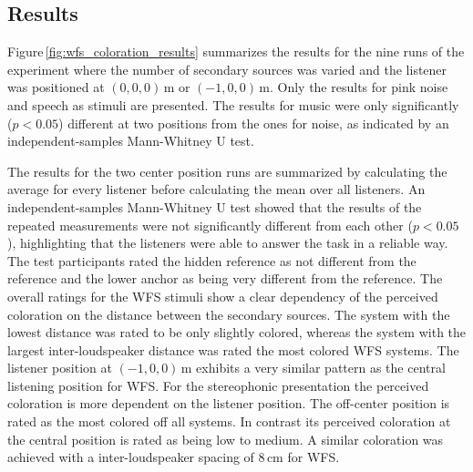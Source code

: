 \subsection{Results}
\label{sec:coloration_results}
%
Figure\,\ref{fig:wfs_coloration_results} summarizes the results for the nine
runs of the experiment where the number of secondary sources was varied and the
listener was positioned at $(0,0,0)$\,m or $(-1,0,0)$\,m. Only the results for
pink noise and speech as stimuli are presented. The results for music
were only significantly ($p<0.05$)
different at two positions from the ones for
noise, as indicated by an independent-samples Mann-Whitney U test.
%
\begin{figure*}[t]
    \small
    \centering
    
    \caption{Average results with confidence intervals for the perceived
    coloration. Dark colors show results for the central listening position,
    lighter colors for the off-center position.
    }
    \label{fig:wfs_coloration_results}
\end{figure*}
%
The results for the two center position runs are summarized by calculating the
average for every listener before calculating the mean over all listeners. An
independent-samples Mann-Whitney U test showed that the results of the repeated
measurements were not significantly different from each other ($p<0.05$), highlighting that
the listeners were able to answer the task in a reliable way.
The test participants rated the hidden reference as not different from the
reference and the lower anchor as being very different from the reference. The overall
ratings for the \ac{WFS} stimuli show a clear dependency of the perceived
coloration on the distance between the secondary sources. The system with the lowest
distance was rated to be only slightly colored, whereas the system with the
largest inter-loudspeaker distance was rated the most colored \ac{WFS} systems. The
listener position at $(-1,0,0)$\,m exhibits a very similar pattern as the
central listening position for \ac{WFS}.
For the stereophonic presentation the perceived coloration is more dependent on
the listener position. The off-center position is rated as the most colored off
all systems. In contrast its
perceived coloration at the central position is rated as being low to medium.
A similar coloration was achieved with a inter-loudspeaker spacing of $8$\,cm for
\ac{WFS}.

